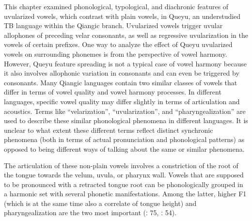 \documentclass[output=paper]{langscibook}
\begin{document}
This chapter examined phonological, typological, and diachronic features of uvularized vowels, which contrast with plain vowels, in Queyu, an understudied TB language within the Qiangic branch. Uvularized vowels trigger uvular allophones of preceding velar consonants, as well as regressive uvularization in the vowels of certain prefixes. One way to analyze the effect of Queyu uvularized vowels on surrounding phonemes is from the perspective of vowel harmony. However, Queyu feature spreading is not a typical case of vowel harmony because it also involves allophonic variation in consonants and can even be triggered by consonants. Many Qiangic languages contain two similar classes of vowels that differ in terms of vowel quality and vowel harmony processes. In different languages, specific vowel quality may differ slightly in terms of articulation and acoustics. Terms like “velarization”, “uvularization”, and “pharyngealization” are used to describe these similar phonological phenomena in different languages. It is unclear to what extent these different terms reflect distinct synchronic phenomena (both in terms of actual pronunciation and phonological patterns) as opposed to being different ways of talking about the same or similar phenomena.

The articulation of these non-plain vowels involves a constriction of the root of the tongue towards the velum, uvula, or pharynx wall. Vowels that are supposed to be pronounced with a retracted tongue root can be phonologically grouped in a harmonic set with several phonetic manifestations. Among the latter, higher F1 (which is at the same time also a correlate of tongue height) and pharyngealization are the two most important (\citealt{Sylak-Glassman2014}ː 75, \citealt{BarrereJanhunen2019}ː 54).
\end{document}
